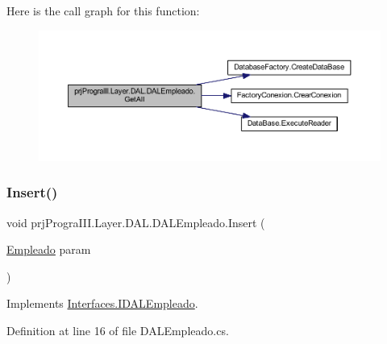 Here is the call graph for this function\+:
\nopagebreak
\begin{figure}[H]
\begin{center}
\leavevmode
\includegraphics[width=350pt]{classprj_progra_i_i_i_1_1_layer_1_1_d_a_l_1_1_d_a_l_empleado_ae4244254c51367a0332e10ffc7e68fcc_cgraph}
\end{center}
\end{figure}
\hypertarget{classprj_progra_i_i_i_1_1_layer_1_1_d_a_l_1_1_d_a_l_empleado_a8593713e7bb16c32041cd8b342cfd3ec}{}\label{classprj_progra_i_i_i_1_1_layer_1_1_d_a_l_1_1_d_a_l_empleado_a8593713e7bb16c32041cd8b342cfd3ec} 
\subsubsection{\texorpdfstring{Insert()}{Insert()}}
{\footnotesize\ttfamily void prj\+Progra\+I\+I\+I.\+Layer.\+D\+A\+L.\+D\+A\+L\+Empleado.\+Insert (\begin{DoxyParamCaption}\item[{\hyperlink{classprj_progra_i_i_i_1_1_layer_1_1_entities_1_1_empleado}{Empleado}}]{param }\end{DoxyParamCaption})}



Implements \hyperlink{interface_interfaces_1_1_i_d_a_l_empleado_ad9609df99d0b1ad098a61ea27d700393}{Interfaces.\+I\+D\+A\+L\+Empleado}.



Definition at line 16 of file D\+A\+L\+Empleado.\+cs.

